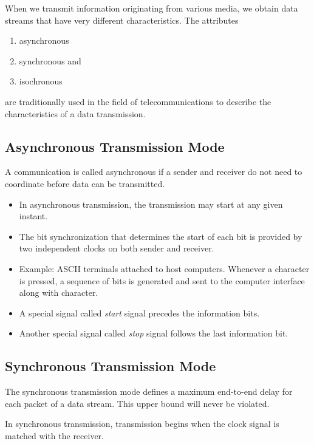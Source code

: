 When we transmit information originating from various media, we obtain data
streams that have very different characteristics. The attributes 
\begin{multicols}{3}
\begin{enumerate}[label=\alph*)]
	\item asynchronous
	\item synchronous and 
	\item isochronous
\end{enumerate}
\end{multicols}


 are traditionally used in the field of telecommunications to describe the characteristics of a data transmission.


\subsection{Asynchronous Transmission Mode}
A communication is called asynchronous if a
sender and receiver do not need to coordinate before data can be transmitted. 
\begin{itemize}
	\item In asynchronous transmission, the transmission may start at any given instant.
	\item The bit synchronization that determines the start of each bit is provided by two independent clocks on both sender and receiver.
	\item Example: ASCII terminals attached to host computers. Whenever a character is pressed, a sequence of bits is generated and sent to the computer interface along with character.
	\item A special signal called \textit{start} signal precedes the information bits.
	\item Another special signal called \textit{stop} signal follows the last information bit.
\end{itemize}

\subsection{Synchronous Transmission Mode}
The synchronous transmission mode defines a maximum end-to-end delay for each packet of a data stream. This upper bound will never be violated.

In synchronous transmission, transmission begins when the clock signal is matched with the receiver.



